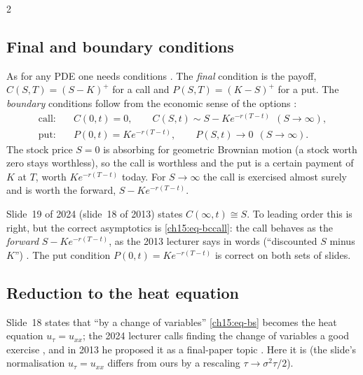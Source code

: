 \begin{paracol}{2}
\subsection{Final and boundary conditions}
As for any PDE one needs conditions . The \emph{final} condition is the payoff, $C(S,T)=(S-K)^+$ for a call and $P(S,T)=(K-S)^+$ for a put.
The \emph{boundary} conditions follow from the economic sense of the options :
\begin{align}
  \text{call:}\quad & C(0,t)=0,\qquad C(S,t)\sim S-Ke^{-r(T-t)}\ \ (S\to\infty),\label{ch15:eq-bccall}\\
  \text{put:}\quad  & P(0,t)=Ke^{-r(T-t)},\qquad P(S,t)\to0\ \ (S\to\infty).\label{ch15:eq-bcput}
\end{align}
The stock price $S=0$ is absorbing for geometric Brownian motion (a stock worth zero stays worthless), so the call is worthless and the put is a
certain payment of $K$ at $T$, worth $Ke^{-r(T-t)}$ today. For $S\to\infty$ the call is exercised almost surely and is worth the forward, $S-Ke^{-r(T-t)}$.

\begin{coursenote}
Slide~19 of 2024 (slide~18 of 2013) states $C(\infty,t)\cong S$. To leading order this is right, but the correct asymptotics is
\eqref{ch15:eq-bccall}: the call behaves as the \emph{forward} $S-Ke^{-r(T-t)}$, as the 2013 lecturer says in words (``discounted $S$ minus $K$'') . The put condition
$P(0,t)=Ke^{-r(T-t)}$ is correct on both sets of slides.
\end{coursenote}

\subsection{Reduction to the heat equation}\label{ch15:sec-heat}
Slide~18 states that ``by a change of variables'' \eqref{ch15:eq-bs} becomes the heat equation $u_\tau=u_{xx}$; the 2024 lecturer calls finding
the change of variables a good exercise , and in 2013 he proposed it as a final-paper topic . Here it is
(the slide's normalisation $u_\tau=u_{xx}$ differs from ours by a rescaling $\tau\to\sigma^2\tau/2$).


\end{paracol}
